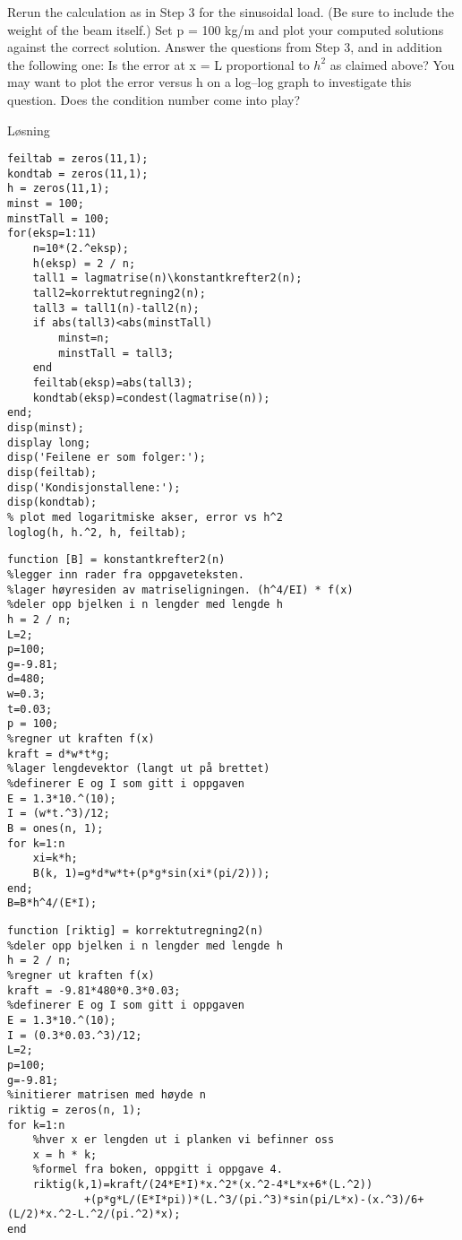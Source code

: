 % 

Rerun the calculation as in Step 3 for the sinusoidal load. (Be sure to include the weight of the beam itself.) Set p = 100 kg/m and plot your computed solutions against the correct solution. Answer the questions from Step 3, and in addition the following one: Is the error at x = L proportional to $h^2$ as claimed above? You may want to plot the error versus h on a log–log graph to investigate this question. Does the condition number come into play?

\vspace{5mm}
Løsning

\begin{lstlisting}[caption={Oppgave5.m}]
feiltab = zeros(11,1); 
kondtab = zeros(11,1);
h = zeros(11,1);
minst = 100; 
minstTall = 100; 
for(eksp=1:11)
    n=10*(2.^eksp);
    h(eksp) = 2 / n;
    tall1 = lagmatrise(n)\konstantkrefter2(n);
    tall2=korrektutregning2(n); 
    tall3 = tall1(n)-tall2(n); 
    if abs(tall3)<abs(minstTall)
        minst=n; 
        minstTall = tall3; 
    end
    feiltab(eksp)=abs(tall3);
    kondtab(eksp)=condest(lagmatrise(n));
end; 
disp(minst); 
display long; 
disp('Feilene er som folger:'); 
disp(feiltab);
disp('Kondisjonstallene:');
disp(kondtab);
% plot med logaritmiske akser, error vs h^2
loglog(h, h.^2, h, feiltab);
\end{lstlisting}

\begin{lstlisting}[caption={konstantkrefter2.m}]
function [B] = konstantkrefter2(n)
%legger inn rader fra oppgaveteksten. 
%lager høyresiden av matriseligningen. (h^4/EI) * f(x) 
%deler opp bjelken i n lengder med lengde h 
h = 2 / n;        
L=2;
p=100; 
g=-9.81; 
d=480; 
w=0.3;
t=0.03; 
p = 100;
%regner ut kraften f(x) 
kraft = d*w*t*g; 
%lager lengdevektor (langt ut på brettet) 
%definerer E og I som gitt i oppgaven
E = 1.3*10.^(10); 
I = (w*t.^3)/12; 
B = ones(n, 1);
for k=1:n
    xi=k*h; 
    B(k, 1)=g*d*w*t+(p*g*sin(xi*(pi/2)));
end;
B=B*h^4/(E*I);
\end{lstlisting}

\begin{lstlisting}[caption={korrektutregning2.m}]
function [riktig] = korrektutregning2(n)
%deler opp bjelken i n lengder med lengde h 
h = 2 / n;
%regner ut kraften f(x) 
kraft = -9.81*480*0.3*0.03;
%definerer E og I som gitt i oppgaven
E = 1.3*10.^(10); 
I = (0.3*0.03.^3)/12; 
L=2;
p=100; 
g=-9.81;
%initierer matrisen med høyde n
riktig = zeros(n, 1);
for k=1:n
    %hver x er lengden ut i planken vi befinner oss
    x = h * k;
    %formel fra boken, oppgitt i oppgave 4. 
    riktig(k,1)=kraft/(24*E*I)*x.^2*(x.^2-4*L*x+6*(L.^2))
    		+(p*g*L/(E*I*pi))*(L.^3/(pi.^3)*sin(pi/L*x)-(x.^3)/6+(L/2)*x.^2-L.^2/(pi.^2)*x);
end
\end{lstlisting}

